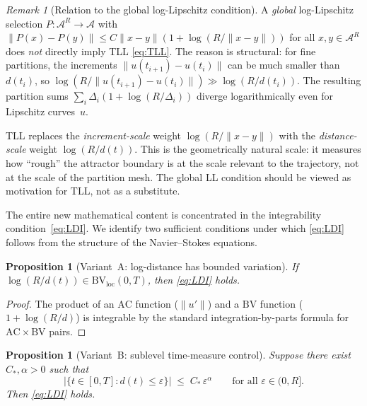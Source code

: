 \documentclass[12pt,a4paper]{article}
\theoremstyle{definition}
\theoremstyle{plain}
\newtheorem{proposition}[definition]{Proposition}
\theoremstyle{remark}
\newtheorem{remark}[definition]{Remark}
\begin{document}
\begin{remark}[Relation to the global log-Lipschitz condition]
\label{rem:global-LL}
A \emph{global} log-Lipschitz selection
$P : \mathcal{A}^R \to \mathcal{A}$ with
$\|P(x)-P(y)\| \le C\|x-y\|(1+\log(R/\|x-y\|))$
for all $x,y \in \mathcal{A}^R$ does \emph{not} directly imply TLL
\eqref{eq:TLL}.  The reason is structural: for fine partitions,
the increments $\|u(t_{i+1})-u(t_i)\|$ can be much smaller than
$d(t_i)$, so $\log(R/\|u(t_{i+1})-u(t_i)\|) \gg \log(R/d(t_i))$.
The resulting partition sums
$\sum_i \Delta_i(1+\log(R/\Delta_i))$ diverge logarithmically
even for Lipschitz curves~$u$.

TLL replaces the \emph{increment-scale} weight
$\log(R/\|x-y\|)$ with the \emph{distance-scale} weight
$\log(R/d(t))$.  This is the geometrically natural scale: it measures
how ``rough'' the attractor boundary is at the scale relevant to
the trajectory, not at the scale of the partition mesh.
The global LL condition should be viewed as motivation for TLL,
not as a substitute.
\end{remark}

The entire new mathematical content is concentrated in the
integrability condition~\eqref{eq:LDI}.  We identify two
sufficient conditions under which \eqref{eq:LDI} follows from
the structure of the Navier--Stokes equations.

\begin{proposition}[Variant~A: log-distance has bounded variation]
\label{prop:LDI-A}
If $\log(R/d(t)) \in \mathrm{BV}_{\mathrm{loc}}(0,T)$, then
\eqref{eq:LDI} holds.
\end{proposition}

\begin{proof}
The product of an $\mathrm{AC}$ function ($\|u'\|$) and a $\mathrm{BV}$
function ($1 + \log(R/d)$) is integrable by the standard
integration-by-parts formula for $\mathrm{AC}\times\mathrm{BV}$ pairs.
\end{proof}

\begin{proposition}[Variant~B: sublevel time-measure control]
\label{prop:LDI-B}
Suppose there exist $C_*, \alpha > 0$ such that
\begingroup
\renewcommand{\theequation}{STC}
\renewcommand{\theHequation}{STC}
\begin{equation}\label{eq:STC}
  \bigl|\{t \in [0,T] : d(t) \le \varepsilon\}\bigr|
  \;\le\;
  C_*\,\varepsilon^\alpha
  \qquad \text{for all } \varepsilon \in (0, R].
\end{equation}
\endgroup
Then \eqref{eq:LDI} holds.
\end{proposition}
\end{document}
